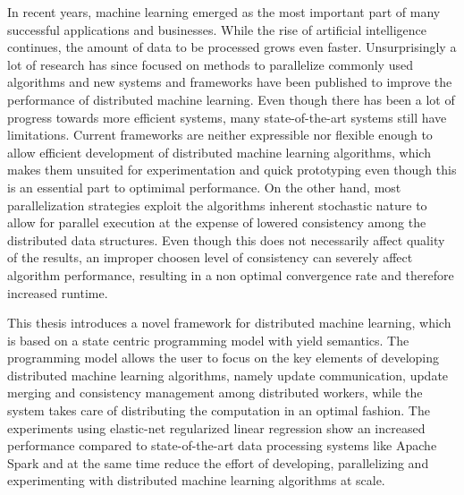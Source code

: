 % 
% 
%
In recent years, machine learning emerged as the most important part of many successful applications and businesses.
While the rise of artificial intelligence continues, the amount of data to be processed grows even faster.
Unsurprisingly a lot of research has since focused on methods to parallelize commonly used algorithms and new systems and frameworks have been published to improve the performance of distributed machine learning.
Even though there has been a lot of progress towards more efficient systems, many state-of-the-art systems still have limitations.
Current frameworks are neither expressible nor flexible enough to allow efficient development of distributed machine learning algorithms, which makes them unsuited for experimentation and quick prototyping even though this is an essential part to optimimal performance.
On the other hand, most parallelization strategies exploit the algorithms inherent stochastic nature to allow for parallel execution at the expense of lowered consistency among the distributed data structures.
Even though this does not necessarily affect quality of the results, an improper choosen level of consistency can severely affect algorithm performance, resulting in a non optimal convergence rate and therefore increased runtime.

This thesis introduces a novel framework for distributed machine learning, which is based on a state centric programming model with yield semantics.
The programming model allows the user to focus on the key elements of developing distributed machine learning algorithms, namely update communication, update merging and consistency management among distributed workers, while the system takes care of distributing the computation in an optimal fashion.
The experiments using elastic-net regularized linear regression show an increased performance compared to state-of-the-art data processing systems like Apache Spark and at the same time reduce the effort of developing, parallelizing and experimenting with distributed machine learning algorithms at scale.
